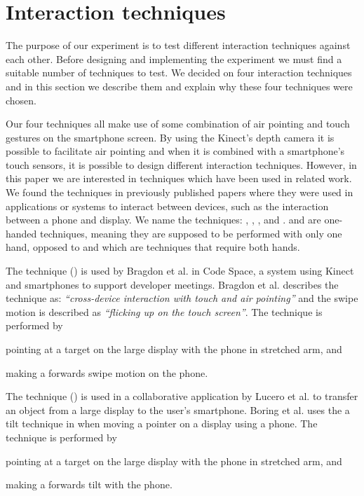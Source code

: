 \section{Interaction techniques}
The purpose of our experiment is to test different interaction techniques against each other.
Before designing and implementing the experiment we must find a suitable number of techniques to test. 
We decided on four interaction techniques and in this section we describe them and explain why these four techniques were chosen.

Our four techniques all make use of some combination of air pointing and touch gestures on the smartphone screen.
By using the Kinect's depth camera it is possible to facilitate air pointing and when it is combined with a smartphone's touch sensors, it is possible to design different interaction techniques.
However, in this paper we are interested in techniques which have been used in related work. 
We found the techniques in previously published papers where they were used in applications or systems to interact between devices, such as the interaction between a phone and display. 
We name the techniques: \swipe, \tilt, \throw, and \pinch.
\swipe and \tilt are one-handed techniques, meaning they are supposed to be performed with only one hand, opposed to \throw and \pinch which are techniques that require both hands.

The \swipe technique () is used by Bragdon et al. \cite{Bragdon:2011} in Code Space, a system using Kinect and smartphones to support developer meetings. 
Bragdon et al. describes the technique as: \emph{``cross-device interaction with touch and air pointing''} and the swipe motion is described as \emph{``flicking up on the touch screen''}. 
The \swipe technique is performed by 
\begin{enumerate*}[label=\itshape\arabic*\upshape)]
	\item{pointing at a target on the large display with the phone in stretched arm, and}
	\item{making a forwards swipe motion on the phone.}
\end{enumerate*}

The \tilt technique () is used in a collaborative application by Lucero et al. \cite{Lucero:2012} to transfer an object from a large display to the user's smartphone.
Boring et al. uses the a tilt technique in \cite{Boring:2009} when moving a pointer on a display using a phone.
The \tilt technique is performed by 
\begin{enumerate*}[label=\itshape\arabic*\upshape)]
	\item{pointing at a target on the large display with the phone in stretched arm, and}
	\item{making a forwards tilt with the phone.}
\end{enumerate*}

